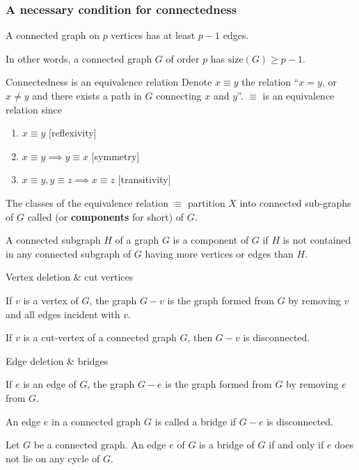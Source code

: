 \documentclass[aspectratio=169]{beamer}
\begin{document}
\begin{frame}\frametitle{A necessary condition for connectedness}
	\begin{theorem}
		A connected graph on $p$ vertices has at least $p-1$ edges.
	\end{theorem}
	In other words, a connected graph $G$ of order $p$ has $\text{size}(G)\geq p-1$.
\end{frame}

\begin{frame}{Connectedness is an equivalence relation}
	Denote $x\equiv y$ the relation  ``$x=y$, or $x\neq y$ and there exists a path in $G$ connecting $x$ and $y$''. $\equiv$ is an equivalence relation since
	\begin{enumerate}
		\item $x\equiv y$ \hfill[reflexivity]
		\item $x\equiv y\implies y\equiv x$ \hfill[symmetry]
		\item $x\equiv y, y\equiv z\implies x\equiv z$ \hfill[transitivity]
	\end{enumerate}
	\begin{definition}
		The classes of the equivalence relation $\equiv$ partition $X$ into connected sub-graphs of $G$ called  (or \textbf{components} for short) of $G$. 
	\end{definition}
	A connected subgraph $H$ of a graph $G$ is a component of $G$ if $H$ is not contained in any connected subgraph of $G$ having more vertices or edges than $H$.
\end{frame}



\begin{frame}{Vertex deletion \& cut vertices}
\begin{definition}
If $v$ is a vertex of $G$, the graph $G-v$ is the graph formed from $G$ by removing $v$ and all edges incident with $v$.
\end{definition}
\begin{definition}
	If $v$ is a cut-vertex of a connected graph $G$, then $G-v$ is disconnected.
\end{definition}
\end{frame}


\begin{frame}{Edge deletion \& bridges}
\begin{definition}
	If $e$ is an edge of $G$, the graph $G-e$ is the graph formed from $G$ by removing $e$ from $G$.
\end{definition}
\begin{definition}[{Bridge}]
An edge $e$ in a connected graph $G$ is called a bridge if $G-e$ is disconnected.
\end{definition}
\begin{theorem}
Let $G$ be a connected graph. An edge $e$ of $G$ is a bridge of $G$ if and only if $e$ does not lie on any cycle of $G$.
\end{theorem}
\end{frame}
\end{document}
